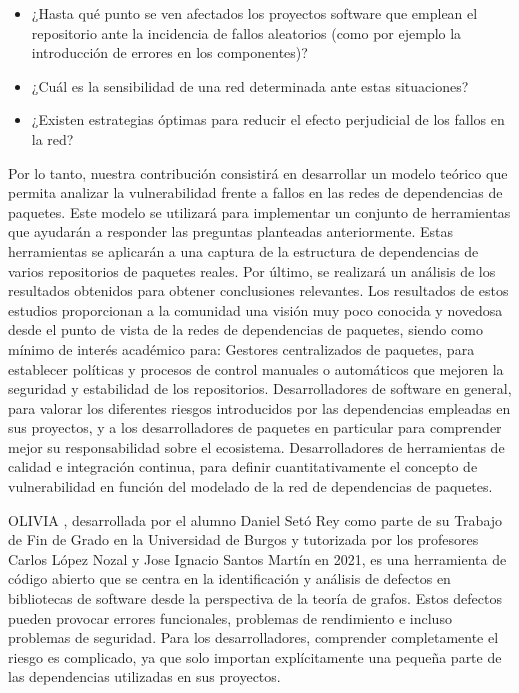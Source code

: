 \begin{itemize} \item ¿Hasta qué punto se ven afectados los proyectos software que emplean el repositorio ante la incidencia de fallos aleatorios (como por ejemplo la introducción de errores en los componentes)? \item ¿Cuál es la sensibilidad de una red determinada ante estas situaciones? \item ¿Existen estrategias óptimas para reducir el efecto perjudicial de los fallos en la red? \end{itemize}
Por lo tanto, nuestra contribución consistirá en desarrollar un modelo teórico que permita analizar la vulnerabilidad frente a fallos en las redes de dependencias de paquetes. Este modelo se utilizará para implementar un conjunto de herramientas que ayudarán a responder las preguntas planteadas anteriormente. Estas herramientas se aplicarán a una captura de la estructura de dependencias de varios repositorios de paquetes reales. Por último, se realizará un análisis de los resultados obtenidos para obtener conclusiones relevantes.
Los resultados de estos estudios proporcionan a la comunidad una visión muy poco conocida y novedosa desde el punto de vista de la redes de dependencias de paquetes, siendo como mínimo de interés académico para:
Gestores centralizados de paquetes, para establecer políticas y procesos de control manuales o automáticos que mejoren la seguridad y estabilidad de los repositorios.
Desarrolladores de software en general, para valorar los diferentes riesgos introducidos por las dependencias empleadas en sus proyectos, y a los desarrolladores de paquetes en particular para comprender mejor su responsabilidad sobre el ecosistema.
Desarrolladores de herramientas de calidad e integración continua, para definir cuantitativamente el concepto de vulnerabilidad en función del modelado de la red de dependencias de paquetes.


OLIVIA \cite{daniel_2022_7358391}, desarrollada por el alumno Daniel Setó Rey como parte de su Trabajo de Fin de Grado en la Universidad de Burgos y tutorizada por los profesores Carlos López Nozal y Jose Ignacio Santos Martín en 2021, es una herramienta de código abierto que se centra en la identificación y análisis de defectos en bibliotecas de software desde la perspectiva de la teoría de grafos. Estos defectos pueden provocar errores funcionales, problemas de rendimiento e incluso problemas de seguridad. Para los desarrolladores, comprender completamente el riesgo es complicado, ya que solo importan explícitamente una pequeña parte de las dependencias utilizadas en sus proyectos.


